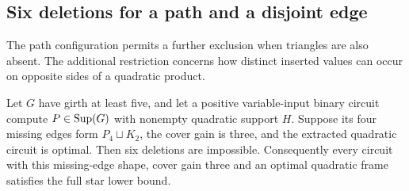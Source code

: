 \subsection{Six deletions for a path and a disjoint edge}
The path configuration permits a further exclusion when triangles are also
absent. The additional restriction concerns how distinct inserted values
can occur on opposite sides of a quadratic product.

\begin{proposition}\label{prop:pathsix}
Let $G$ have girth at least five, and let a positive variable-input binary
circuit compute $P\in\operatorname{Sup}(G)$ with nonempty quadratic support $H$.
Suppose its four missing edges form $P_4\sqcup K_2$, the cover gain is
three, and the extracted quadratic circuit is optimal. Then six deletions
are impossible. Consequently every circuit with this missing-edge shape,
cover gain three and an optimal quadratic frame satisfies the full star
lower bound.
\end{proposition}
